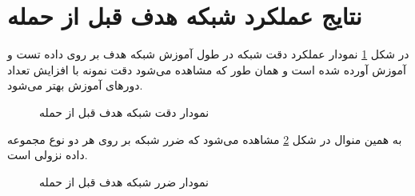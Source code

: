 \section{نتایج عملکرد شبکه هدف قبل از حمله}
در شکل 
\ref{before_targeted_model_accuracy}
نمودار عملکرد دقت شبکه در طول آموزش شبکه هدف بر روی داده تست و آموزش آورده شده است و همان طور که مشاهده می‌شود دقت نمونه با افزایش تعداد دورهای آموزش بهتر می‌شود.
\begin{figure}[H]
	\caption{نمودار دقت شبکه هدف قبل از حمله}
	\label{before_targeted_model_accuracy}
\end{figure}
 به همین منوال در شکل 
\ref{before_targeted_model_loss}
مشاهده می‌شود که ضرر شبکه بر روی هر دو نوع مجموعه داده نزولی است.
\begin{figure}[H]
	\caption{نمودار ضرر شبکه هدف قبل از حمله}
	\label{before_targeted_model_loss}
\end{figure}

